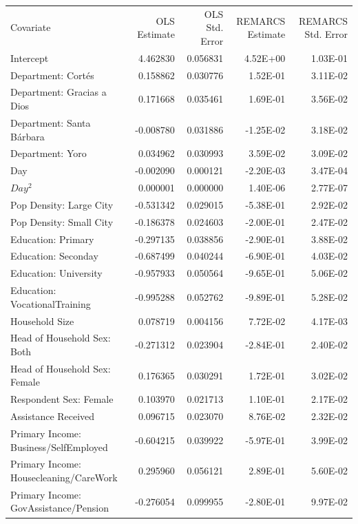 \begin{table}
    \small
    \centering
    \begin{tabular}{lrrrr}
    Covariate	&	OLS Estimate	&	OLS Std. Error	&	REMARCS Estimate	&	REMARCS Std. Error	\\
Intercept	&	4.462830	&	0.056831	&	4.52E+00	&	1.03E-01	\\
Department: Cort{\'e}s	&	0.158862	&	0.030776	&	1.52E-01	&	3.11E-02	\\
Department: Gracias a Dios	&	0.171668	&	0.035461	&	1.69E-01	&	3.56E-02	\\
Department: Santa B{\'a}rbara	&	-0.008780	&	0.031886	&	-1.25E-02	&	3.18E-02	\\
Department: Yoro	&	0.034962	&	0.030993	&	3.59E-02	&	3.09E-02	\\
Day	&	-0.002090	&	0.000121	&	-2.20E-03	&	3.47E-04	\\
$Day^2$	&	0.000001	&	0.000000	&	1.40E-06	&	2.77E-07	\\
Pop Density: Large City	&	-0.531342	&	0.029015	&	-5.38E-01	&	2.92E-02	\\
Pop Density: Small City	&	-0.186378	&	0.024603	&	-2.00E-01	&	2.47E-02	\\
Education: Primary	&	-0.297135	&	0.038856	&	-2.90E-01	&	3.88E-02	\\
Education: Seconday	&	-0.687499	&	0.040244	&	-6.90E-01	&	4.03E-02	\\
Education: University	&	-0.957933	&	0.050564	&	-9.65E-01	&	5.06E-02	\\
Education: VocationalTraining	&	-0.995288	&	0.052762	&	-9.89E-01	&	5.28E-02	\\
Household Size	&	0.078719	&	0.004156	&	7.72E-02	&	4.17E-03	\\
Head of Household Sex: Both	&	-0.271312	&	0.023904	&	-2.84E-01	&	2.40E-02	\\
Head of Household Sex: Female	&	0.176365	&	0.030291	&	1.72E-01	&	3.02E-02	\\
Respondent Sex: Female	&	0.103970	&	0.021713	&	1.10E-01	&	2.17E-02	\\
Assistance Received	&	0.096715	&	0.023070	&	8.76E-02	&	2.32E-02	\\
Primary Income: Business/SelfEmployed	&	-0.604215	&	0.039922	&	-5.97E-01	&	3.99E-02	\\
Primary Income: Housecleaning/CareWork	&	0.295960	&	0.056121	&	2.89E-01	&	5.60E-02	\\
Primary Income: GovAssistance/Pension	&	-0.276054	&	0.099955	&	-2.80E-01	&	9.97E-02	\\

\end{tabular}
\end{table}
